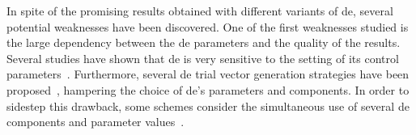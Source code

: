 \documentclass[review,3p]{elsarticle}
\newcommand{\DE}{{\sc de}}
\begin{document}
In spite of the promising results obtained with different variants of \DE{}, several potential weaknesses have
been discovered.
%
One of the first weaknesses studied %
is the large dependency between the \DE{} parameters and the quality of the results.
%
%
Several studies have shown that \DE{} is very sensitive to the setting of its control parameters~\cite{Gamperle:02,Zielinski:06}.
%
Furthermore, several \DE{} trial vector generation strategies have been proposed~\cite{Price:05,Gong:11}, hampering the choice of \DE{}'s parameters and components.
%
In order to sidestep this drawback, some schemes consider the simultaneous use of several \DE{} components and parameter values~\cite{Zhang:09,Piotrowski:13}.
%
%

%
%
%
%
%
%
%
%
%
\end{document}
